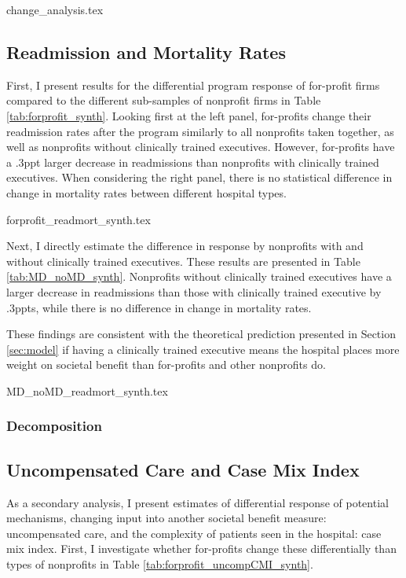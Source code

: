 \documentclass[12pt]{article}
\begin{document}
     {change_analysis.tex}

     
     \subsection{Readmission and Mortality Rates}

     First, I present results for the differential program response of for-profit firms compared to the different sub-samples of nonprofit firms in Table \ref{tab:forprofit_synth}. Looking first at the left panel, for-profits change their readmission rates after the program similarly to all nonprofits taken together, as well as nonprofits without clinically trained executives. However, for-profits have a .3ppt larger decrease in readmissions than nonprofits with clinically trained executives. When considering the right panel, there is no statistical difference in change in mortality rates between different hospital types. 

     {forprofit_readmort_synth.tex}

     Next, I directly estimate the difference in response by nonprofits with and without clinically trained executives. These results are presented in Table \ref{tab:MD_noMD_synth}. Nonprofits without clinically trained executives have a larger decrease in readmissions than those with clinically trained executive by .3ppts, while there is no difference in change in mortality rates. 

     These findings are consistent with the theoretical prediction presented in Section \ref{sec:model} if having a clinically trained executive means the hospital places more weight on societal benefit than for-profits and other nonprofits do. 

     {MD_noMD_readmort_synth.tex}

    \subsubsection{Decomposition}

    

     


    \subsection{Uncompensated Care and Case Mix Index}

    As a secondary analysis, I present estimates of differential response of potential mechanisms, changing input into another societal benefit measure: uncompensated care, and the complexity of patients seen in the hospital: case mix index. First, I investigate whether for-profits change these differentially than types of nonprofits in Table \ref{tab:forprofit_uncompCMI_synth}. 
\end{document}
